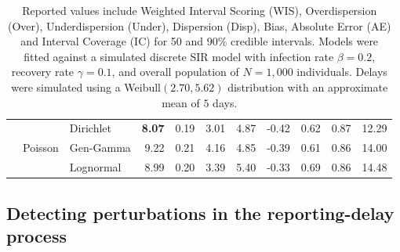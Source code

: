 \documentclass[12pt]{article}
\begin{document}
\begin{table}[!htb]
\begin{tabular}{>{\raggedleft\arraybackslash}p{0.45in}|r | >{\raggedleft\arraybackslash}p{0.85in} | r r r r r r r r}
\\

& \multirow{3}{*}{Poisson}
& \cellcolor{delayC!25}Dirichlet & \cellcolor{delayC!25}\bf  8.07 & \cellcolor{delayC!25}0.19 & \cellcolor{delayC!25}3.01 & \cellcolor{delayC!25}4.87 & \cellcolor{delayC!25}-0.42 & \cellcolor{delayC!25}0.62 & \cellcolor{delayC!25}0.87 & \cellcolor{delayC!25}12.29 \\
& & \cellcolor{delayB!25}Gen-Gamma & \cellcolor{delayB!25}9.22 & \cellcolor{delayB!25}0.21 & \cellcolor{delayB!25}4.16 & \cellcolor{delayB!25}4.85 & \cellcolor{delayB!25}-0.39 & \cellcolor{delayB!25}0.61 & \cellcolor{delayB!25}0.86 & \cellcolor{delayB!25}14.00 \\
& & \cellcolor{delayA!25}Lognormal & \cellcolor{delayA!25}8.99 & \cellcolor{delayA!25}0.20 & \cellcolor{delayA!25}3.39 & \cellcolor{delayA!25}5.40 & \cellcolor{delayA!25}-0.33 & \cellcolor{delayA!25}0.69 & \cellcolor{delayA!25}0.86 & \cellcolor{delayA!25}14.48 \\

\bottomrule
\end{tabular}
\caption*{\tiny Reported values include Weighted Interval Scoring (WIS), Overdispersion (Over), Underdispersion (Under), Dispersion (Disp), Bias, Absolute Error (AE) and Interval Coverage (IC) for 50 and 90\% credible intervals. Models were fitted against a simulated discrete SIR model with infection rate $\beta = 0.2$, recovery rate $\gamma = 0.1$, and overall population of $N = 1,000$ individuals. Delays were simulated using a Weibull$(2.70, 5.62)$ distribution with an approximate mean of $5$ days.}
\label{tab:wissim}
\end{table}


\subsection{\color{red} Detecting perturbations in the reporting-delay process}
\end{document}
